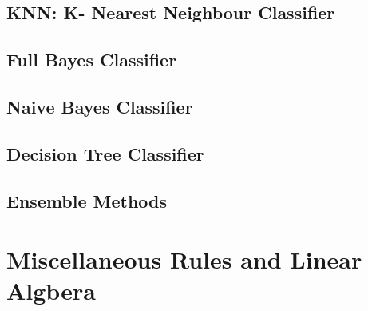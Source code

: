 \documentclass{article}
\begin{document}
    \subsection{KNN: K- Nearest Neighbour Classifier}
        
    \subsection{Full Bayes Classifier}
        
    \subsection{Naive Bayes Classifier}
        
    \newpage
    \subsection{Decision Tree Classifier}
        
    \newpage
    \subsection{Ensemble Methods}
        

\section{Miscellaneous Rules and Linear Algbera}

\end{document}
